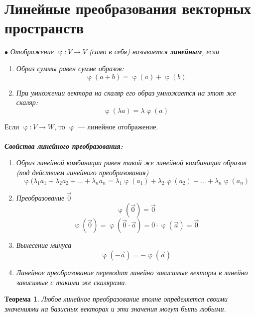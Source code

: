\documentclass[a4paper, 12pt]{article}
\newtheorem*{theorem}{Теорема}
\renewcommand{\varphi}{\upvarphi}
\begin{document}
\section{Линейные преобразования векторных пространств}
$\bullet$ \textit{Отображение $\varphi: V \rightarrow V$ (само в себя) называется \textbf{линейным}, если}
\begin{enumerate}
    \item \textit{Образ суммы равен сумме образов:}
    $$\varphi(a+b)=\varphi(a)+\varphi(b)$$
    \item \textit{При умножении вектора на скаляр его образ умножается на этот же скаляр:}
    $$\varphi(\lambda a)=\lambda \varphi(a)$$
\end{enumerate}
Если $\varphi: V \rightarrow W$, то $\varphi$ --- линейное отображение.\\\\
\textit{\textbf{Свойства линейного преобразования:}}
\begin{enumerate}
    \item \textit{Образ линейной комбинации равен такой же линейной комбинации образов (под действием линейного преобразования)}
    $$\varphi(\lambda_1a_1+\lambda_2a_2+\dots+\lambda_na_n=\lambda_1\varphi(a_1)+\lambda_2\varphi(a_2)+\dots+\lambda_n\varphi(a_n)$$
    \item \textit{Преобразование} $\vec0$
    $$\varphi(\vec0)=\vec0$$
    $$\varphi(\vec0)=\varphi(\vec0\cdot\vec a)=0\cdot \varphi(\vec a)=\vec0$$
    \item \textit{Вынесение минуса}
    $$\varphi(-\vec a)=-\varphi(\vec a)$$
    \item \textit{Линейное преобразование переводит линейно зависимые векторы в линейно зависимые с такими же скалярами.}
\end{enumerate}
\begin{theorem}
    Любое линейное преобразование вполне определяется своими значениями на базисных векторах и эти значения могут быть любыми.
\end{theorem}
\end{document}
